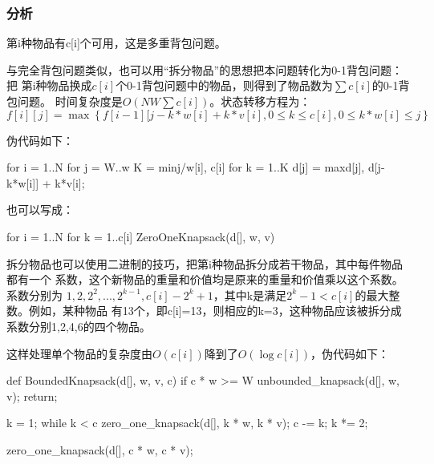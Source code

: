 \subsubsection{分析}
第i种物品有c[i]个可用，这是多重背包问题。

与完全背包问题类似，也可以用“拆分物品”的思想把本问题转化为0-1背包问题：把
第i种物品换成$c[i]$个0-1背包问题中的物品，则得到了物品数为$\sum c[i]$的0-1背包问题。
时间复杂度是$O(NW\sum c[i])$。状态转移方程为：
$$f[i][j]=\max\left\{f[i-1][j-k*w[i]+k*v[i], 0 \leq k \leq c[i], 0 \leq k*w[i] \leq j\right\}$$

伪代码如下：
\begin{Code}
for i = 1..N
    for j = W..w
        K = min{j/w[i], c[i]}
        for k = 1..K
            d[j] = max{d[j], d[j-k*w[i]] + k*v[i]};
\end{Code}

也可以写成：
\begin{Code}
for i = 1..N
    for k = 1..c[i]
        ZeroOneKnapsack(d[], w, v)
\end{Code}

拆分物品也可以使用二进制的技巧，把第i种物品拆分成若干物品，其中每件物品都有一个
系数，这个新物品的重量和价值均是原来的重量和价值乘以这个系数。系数分别为
$1,2,2^2,...,2^{k-1},c[i]-2^k+1$，其中k是满足$2^k-1<c[i]$的最大整数。例如，某种物品
有13个，即c[i]=13，则相应的k=3，这种物品应该被拆分成系数分别1,2,4,6的四个物品。

这样处理单个物品的复杂度由$O(c[i])$降到了$O(\log c[i])$，伪代码如下：
\begin{Code}
def BoundedKnapsack(d[], w, v, c)
    if c * w >= W
        unbounded_knapsack(d[], w, v);
        return;

    k = 1;
    while k < c
        zero_one_knapsack(d[], k * w, k * v);
        c -= k;
        k *= 2;

    zero_one_knapsack(d[], c * w, c * v);
\end{Code}

